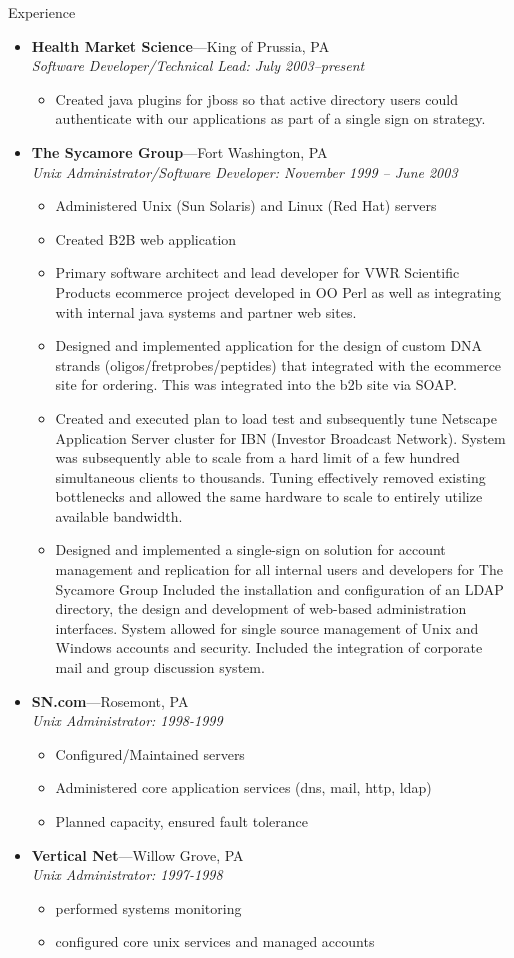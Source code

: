 \documentclass[11pt,oneside]{article}
\newenvironment{ressection}[1]{
	\vspace{4pt}
	{\fontfamily{phv}\selectfont\Large#1}
	\begin{itemize}
	\vspace{3pt}
}{
	\end{itemize}
}
\newcommand{\ressubitem}[1]{
	\vspace{-1pt}
	\item \begin{flushleft} #1 \end{flushleft}
}
\newcommand{\resbigitem}[3]{
	\vspace{-5pt}
	\item
	\textbf{#1}---#2 \\
	\textit{#3}
}
\newenvironment{ressubsec}[3]{
	\resbigitem{#1}{#2}{#3}
	\vspace{-2pt}
	\begin{itemize}
}{
	\end{itemize}
}
\begin{document}
\begin{ressection}{Experience}
\begin{ressubsec}{Health Market Science}{King of Prussia, PA}{Software Developer/Technical Lead: July 2003--present}
        \ressubitem{Created java plugins for jboss so that active directory users could authenticate with our applications as part of a single sign on strategy.}
	\end{ressubsec}
	\begin{ressubsec}{The Sycamore Group}{Fort Washington, PA}{Unix Administrator/Software Developer: November 1999 -- June 2003}
		\ressubitem{Administered Unix (Sun Solaris) and Linux (Red Hat) servers}
		\ressubitem{Created B2B web application}
	        \ressubitem{Primary software architect and lead developer for VWR Scientific Products ecommerce project developed in OO Perl as well as integrating with internal java systems and partner web sites. }
	        \ressubitem{Designed and implemented application for the design of custom DNA strands (oligos/fretprobes/peptides) that integrated with the ecommerce site for ordering. This was integrated into the b2b site via SOAP.}
	        \ressubitem{Created and executed plan to load test and subsequently tune Netscape Application Server cluster for IBN (Investor Broadcast Network). System was subsequently able to scale from a hard limit of a few hundred simultaneous clients to thousands. Tuning effectively removed existing bottlenecks and allowed the same hardware to scale to entirely utilize available bandwidth. }
	        \ressubitem{Designed and implemented a single-sign on solution for account management and replication for all internal users and developers for The Sycamore Group Included the installation and configuration of an LDAP directory, the design and development of web-based administration interfaces. System allowed for single source management of Unix and Windows accounts and security. Included the integration of corporate mail and group discussion system. }
    \end{ressubsec}
	\begin{ressubsec}{SN.com}{Rosemont, PA}{Unix Administrator: 1998-1999}
		\ressubitem{Configured/Maintained servers}
		\ressubitem{Administered core application services (dns, mail, http, ldap)}
		\ressubitem{Planned capacity, ensured fault tolerance}
	\end{ressubsec}
	\begin{ressubsec}{Vertical Net}{Willow Grove, PA}{Unix Administrator: 1997-1998}
		\ressubitem{performed systems monitoring}
		\ressubitem{configured core unix services and managed accounts}
	\end{ressubsec}
\end{ressection}
\end{document}
